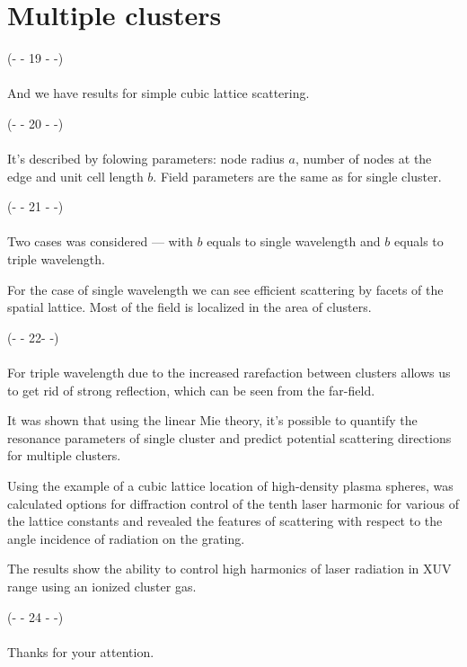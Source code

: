\section{Multiple clusters}

\noindent(- - 19 - -)\\~\\

And we have results for simple cubic lattice scattering.

\noindent(- - 20 - -)\\~\\
It's described by folowing parameters: node radius $a$, number of nodes at the edge and unit cell length $b$. Field parameters are the same as for single cluster.

\noindent(- - 21 - -)\\~\\
Two cases was considered --- with $b$ equals to single wavelength and $b$ equals to triple wavelength.

For the case of single wavelength we can see efficient scattering by facets of the spatial lattice. Most of the field is localized in the area of clusters.

\noindent(- - 22- -)\\~\\
For triple wavelength due to the increased rarefaction between clusters allows us to get rid of strong reflection, which can be seen from the far-field.


It was shown that using the linear Mie theory, it's possible to quantify the resonance parameters of single cluster and predict potential scattering directions for multiple clusters. 

Using the example of a cubic lattice location of high-density plasma spheres, was calculated options for diffraction control of the tenth laser harmonic for various of the lattice constants and revealed the features of scattering with respect to the angle incidence of radiation on the grating.

The results show the ability to control high harmonics of laser radiation in XUV range using an ionized cluster gas.

\noindent(- - 24 - -)\\~\\

Thanks for your attention.